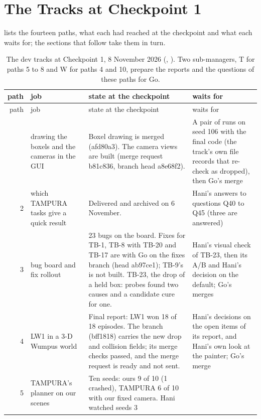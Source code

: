 \section{The Tracks at Checkpoint 1}
\label{sec:tracks-table}

 lists the fourteen paths, what each had reached at the checkpoint
and what each waits for; the sections that follow take them in turn.

\begin{small}
\begin{longtable}{@{}rP{0.15\textwidth}P{0.38\textwidth}P{0.29\textwidth}@{}}
\caption[The dev tracks at Checkpoint 1.]{The dev tracks at Checkpoint 1, 8 November
2026 (, ). Two sub-managers, T for paths 5 to
8 and W for paths 4 and 10, prepare the reports and the questions of these paths for
Go.}\label{tab:tracks}\\
\toprule
path & job & state at the checkpoint & waits for \\
\midrule
\endfirsthead
\toprule
path & job & state at the checkpoint & waits for \\
\midrule
\endhead
\bottomrule
{} & drawing the boxels and the cameras in the GUI &
Boxel drawing is merged (afd80a3). The camera views are built (merge request b81c836,
branch head a8e68f2). &
A pair of runs on seed 106 with the final code (the track's own file records that
re-check as dropped), then Go's merge \\
2 & which TAMPURA tasks give a quick result &
Delivered and archived on 6 November. &
Hani's answers to questions Q40 to Q45 (three are answered) \\
3 & bug board and fix rollout &
23 bugs on the board. Fixes for TB-1, TB-8 with TB-20 and TB-17 are with Go on the
fixes branch (head ab97ce1); TB-9's is not built. TB-23, the drop of a held box: probes found two causes and
a candidate cure for one. &
Hani's visual check of TB-23, then its A/B and Hani's decision on the default; Go's
merges \\
4 & LW1 in a 3-D Wumpus world &
Final report: LW1 won 18 of 18 episodes. The branch (bff1818) carries the new drop and
collision fields; its merge checks passed, and the merge request is ready and not
sent. &
Hani's decisions on the open items of its report, and Hani's own look at the painter; Go's
merge \\
5 & TAMPURA's planner on our scenes &
Ten seeds: ours 9 of 10 (1 crashed), TAMPURA 6 of 10 with our fixed camera. Hani watched seeds 3

\end{longtable}
\end{small}

